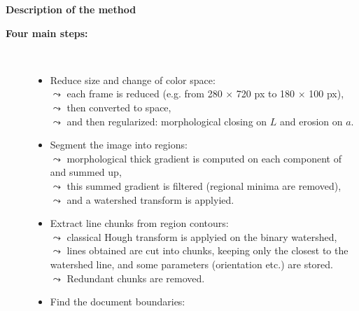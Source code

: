   \vspace*{0.4em}


  \vspace*{-0.8em}

  \begin{columns}[t]
    \begin{column}{0.49\textwidth}
      \begin{block}{\bf Description of the method}
      \begin{description}
        \item[{\bf Four main steps:}] ~
        \begin{itemize}
        \item  Reduce size and change of color space:  \\%
            $\leadsto$ each frame is reduced (e.g. from 280 $\times$ 720 px to 180 $\times$ 100 px),\\
            $\leadsto$ then converted to \Lab space,\\
            $\leadsto$ and then regularized: morphological closing on \ensuremath{L} and erosion on \ensuremath{a}. 
	   \item  Segment the image into regions: \\ %
	        $\leadsto$ morphological thick gradient is computed on each component of \Lab and summed up,\\
	        $\leadsto$   this summed gradient is filtered (regional minima are removed), \\
	        $\leadsto$ and a watershed transform is applyied.
       \item  Extract line chunks from region contours:  \\%
            $\leadsto$ classical Hough transform is applyied on the binary watershed,\\
            $\leadsto$ lines obtained are cut into chunks, keeping only the closest to the watershed line, and some parameters (orientation etc.) are stored.\\
		  $\leadsto$ Redundant chunks are removed.
       \item  Find the document boundaries: \\

\end{itemize}
\end{description}
\end{block}
\end{column}
\end{columns}
